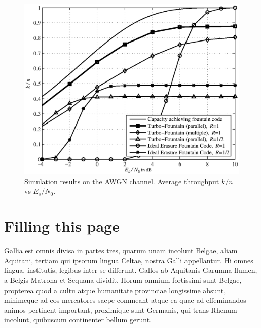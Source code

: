 \documentclass[journal, a4paper]{IEEEtran}
\begin{document}
\begin{figure}[!hbt]
    \begin{center}
    \includegraphics[width=\columnwidth]{figs/plot_tf.eps}
    \caption{Simulation results on the AWGN channel. Average throughput $k/n$ vs $E_s/N_0$.}
    \label{fig:tf_plot}
    \end{center}
\end{figure}

\section{Filling this page}
Gallia est omnis divisa in partes tres, quarum unam incolunt Belgae, aliam Aquitani, tertiam qui ipsorum lingua Celtae, nostra Galli appellantur. Hi omnes lingua, institutis, legibus inter se differunt. Gallos ab Aquitanis Garumna flumen, a Belgis Matrona et Sequana dividit. Horum omnium fortissimi sunt Belgae, propterea quod a cultu atque humanitate provinciae longissime absunt, minimeque ad eos mercatores saepe commeant atque ea quae ad effeminandos animos pertinent important, proximique sunt Germanis, qui trans Rhenum incolunt, quibuscum continenter bellum gerunt.
\end{document}
